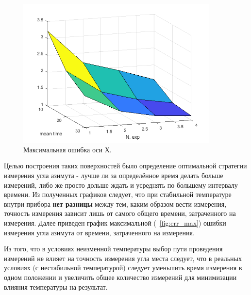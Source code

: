 \documentclass[a4paper,12pt]{article}
\begin{document}


\begin{figure}[h!] 
\centering
\includegraphics[width=0.9\textwidth]{mesh.png} 
\caption{\label{fig:Mesh} Максимальная ошибка оси Х.}
\end{figure}


Целью построения таких поверхностей было определение оптимальной стратегии измерения угла азимута - лучше ли за определённое время делать больше измерений, либо же просто дольше ждать и усреднять по большему интервалу времени. Из полученных графиков следует, что при стабильной температуре внутри прибора \textbf{нет разницы} между тем, каким образом вести измерения, точность измерения зависит лишь от самого общего времени, затраченного на измерения. Далее приведен график максимальной (~\ref{fig:err_max}) ошибки измерения угла азимута от времени, затраченного на измерения. 

 Из того, что в условиях неизменной температуры выбор пути проведения измерений не влияет на точность измерения угла места следует, что в реальных условиях (с нестабильной температурой) следует уменьшить время измерения в одном положении и увеличить общее количество измерений для минимизации влияния температуры на результат.
\end{document}
